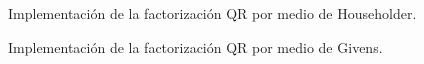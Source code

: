 \documentclass[journal, monochrome]{IEEEtran}
\begin{document}

\begin{figure}
	\caption{Implementación de la factorización QR por medio de Householder.}
\end{figure}

\begin{figure}
	\vspace{0.5cm}
	\caption{Implementación de la factorización QR por medio de Givens.}
\end{figure}





%
%
%
%
\end{document}
